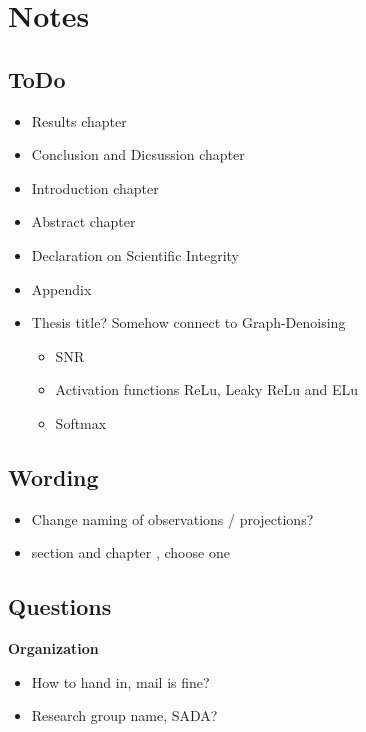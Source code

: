 \chapter{Notes}

\section{ToDo}
\begin{itemize}
    \item Results chapter
    \item Conclusion and Dicsussion chapter
    \item Introduction chapter
    \item Abstract chapter
    \item Declaration on Scientific Integrity
    \item Appendix
    \item Thesis title? Somehow connect to Graph-Denoising
    \begin{itemize}
        \item SNR
        \item Activation functions ReLu,  Leaky ReLu and ELu
        \item Softmax
    \end{itemize}
\end{itemize}

\section{Wording}
\begin{itemize}
    \item Change naming of observations / projections?
    \item section and chapter , choose one
\end{itemize}

\section{Questions}
\textbf{Organization}
\begin{itemize}
    \item How to hand in, mail is fine?
    \item Research group name, SADA?
\end{itemize}

\clearpage


